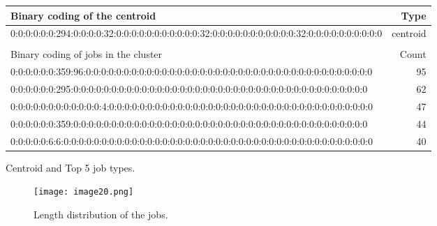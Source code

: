 \documentclass{jhps}
\begin{document}
\begin{minipage}{\textwidth}
\begingroup
  \begin{subtable}{\textwidth}
  \centering
  \begin{tiny}
    \begin{tabular}{@{ }l@{ }|@{ }r@{ }}
      \rowcolor{tabhcolor}
      Binary coding of the centroid                                                                                 &  Type     \\
      \hline
      0:0:0:0:0:0:294:0:0:0:0:32:0:0:0:0:0:0:0:0:0:0:0:32:0:0:0:0:0:0:0:0:0:0:0:32:0:0:0:0:0:0:0:0:0:0 &  centroid \\
      \multicolumn{2}{l}{}                                                                             \\
      \rowcolor{tabhcolor}
      Binary coding of jobs in the cluster                                                                      &  Count    \\
      \hline
      0:0:0:0:0:0:359:96:0:0:0:0:0:0:0:0:0:0:0:0:0:0:0:0:0:0:0:0:0:0:0:0:0:0:0:0:0:0:0:0:0:0:0:0:0:0   &  95       \\
      0:0:0:0:0:0:295:0:0:0:0:0:0:0:0:0:0:0:0:0:0:0:0:0:0:0:0:0:0:0:0:0:0:0:0:0:0:0:0:0:0:0:0:0:0:0    &  62       \\
      0:0:0:0:0:0:0:0:0:0:0:0:4:0:0:0:0:0:0:0:0:0:0:0:0:0:0:0:0:0:0:0:0:0:0:0:0:0:0:0:0:0:0:0:0:0:0:0  &  47       \\
      0:0:0:0:0:0:359:0:0:0:0:0:0:0:0:0:0:0:0:0:0:0:0:0:0:0:0:0:0:0:0:0:0:0:0:0:0:0:0:0:0:0:0:0:0:0    &  44       \\
      0:0:0:0:0:6:6:0:0:0:0:0:0:0:0:0:0:0:0:0:0:0:0:0:0:0:0:0:0:0:0:0:0:0:0:0:0:0:0:0:0:0:0:0:0:0:0:0  &  40       \\
    \end{tabular}
  \end{tiny}
  \caption{Centroid and Top 5 job types.}
  \label{tab:bin_all:top_jobs}
  \end{subtable}
\endgroup

\medskip

\begingroup
  \begin{subfigure}{\textwidth}
  \centering
  \texttt{[image: image20.png]}
  \caption{Length distribution of the jobs.}
  \label{fig:bin_all:length}
  \end{subfigure}
\endgroup

\label{fig:bin_all}
\end{minipage}
\end{document}

